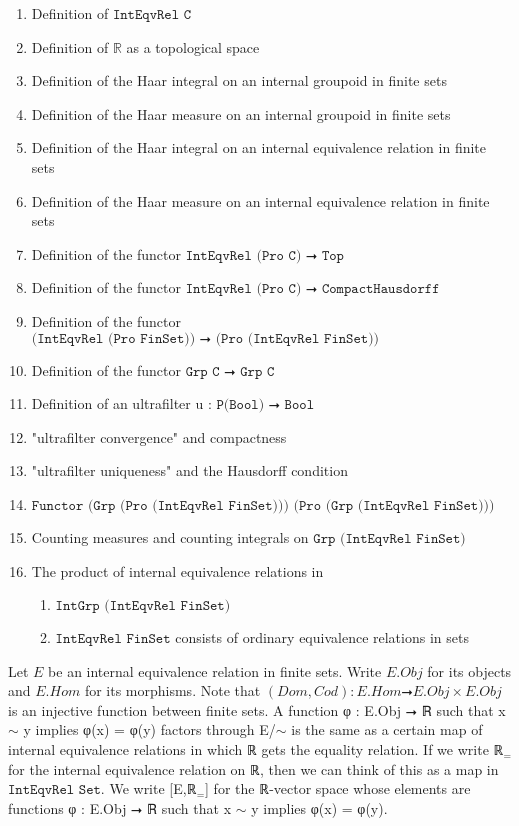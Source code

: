 \documentclass[13pt]{amsart}
\begin{document}
\begin{enumerate}
\item Definition of $\texttt{IntEqvRel C}$
\item Definition of $\texttt{ℝ}$ as a topological space
\item Definition of the Haar integral on an internal groupoid in finite sets
\item Definition of the Haar measure on an internal groupoid in finite sets
\item Definition of the Haar integral on an internal equivalence relation in finite sets
\item Definition of the Haar measure on an internal equivalence relation in finite sets
\item Definition of the functor $\texttt{IntEqvRel (Pro C) ⭢ Top}$
\item Definition of the functor $\texttt{IntEqvRel (Pro C) ⭢ CompactHausdorff}$
\item Definition of the functor $\texttt{(IntEqvRel (Pro FinSet)) ⭢ (Pro (IntEqvRel FinSet))}$
\item Definition of the functor $\texttt{Grp C ⭢ Grp C}$
\item Definition of an ultrafilter u : $\texttt{P(Bool) ⭢ Bool}$
\item "ultrafilter convergence" and compactness
\item "ultrafilter uniqueness" and the Hausdorff condition
\item $\texttt{Functor (Grp (Pro (IntEqvRel FinSet))) (Pro (Grp (IntEqvRel FinSet)))}$
\item Counting measures and counting integrals on $\texttt{Grp (IntEqvRel FinSet)}$
\item The product of internal equivalence relations in 
\begin{enumerate}
\item $\texttt{IntGrp (IntEqvRel FinSet)}$
\item $\texttt{IntEqvRel FinSet}$ consists of ordinary equivalence relations in sets
\end{enumerate}
\end{enumerate}

Let $E$ be an internal equivalence relation in finite sets. Write $E.Obj$ for its objects and $E.Hom$ for its morphisms. Note that $(Dom,Cod): E.Hom ⭢ E.Obj \times E.Obj$ is an injective function between finite sets. A function φ : E.Obj ⭢ ℝ such that x $\sim$ y implies φ(x) = φ(y) factors through E/$\sim$ is the same as a certain map of internal equivalence relations in which ℝ gets the equality relation. If we write ℝ${}_{=}$ for the internal equivalence relation on ℝ, then we can think of this as a map in $\texttt{IntEqvRel Set}$. We write [E,ℝ${}_{=}$] for the ℝ-vector space whose elements are functions φ : E.Obj ⭢ ℝ such that x $\sim$ y implies φ(x) = φ(y).
\end{document}
